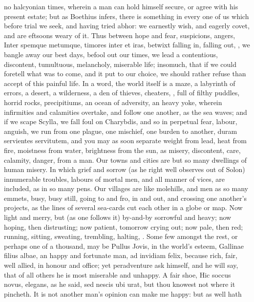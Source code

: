 {{no halcyonian times, wherein a man can hold himself secure, or agree
with his present estate; but as Boethius infers, there is
something in every one of us which before trial we seek, and having
tried abhor:  we earnestly wish, and eagerly covet, and are
eftsoons weary of it. Thus between hope and fear, suspicions, angers,
Inter spemque metumque, timores inter et iras, betwixt falling
in, falling out, \etc{}, we bangle away our best days, befool out our
times, we lead a contentious, discontent, tumultuous, melancholy,
miserable life; insomuch, that if we could foretell what was to come,
and it put to our choice, we should rather refuse than accept of this
painful life. In a word, the world itself is a maze, a labyrinth of
errors, a desert, a wilderness, a den of thieves, cheaters, \etc{}, full
of filthy puddles, horrid rocks, precipitiums, an ocean of adversity,
an heavy yoke, wherein infirmities and calamities overtake, and follow
one another, as the sea waves; and if we scape Scylla, we fall foul on
Charybdis, and so in perpetual fear, labour, anguish, we run from one
plague, one mischief, one burden to another, duram servientes
servitutem, and you may as soon separate weight from lead, heat from
fire, moistness from water, brightness from the sun, as misery,
discontent, care, calamity, danger, from a man. Our towns and cities
are but so many dwellings of human misery. In which grief and sorrow
(as he right well observes out of Solon) innumerable troubles,
labours of mortal men, and all manner of vices, are included, as in so
many pens. Our villages are like molehills, and men as so many emmets,
busy, busy still, going to and fro, in and out, and crossing one
another's projects, as the lines of several sea-cards cut each other in
a globe or map. Now light and merry, but (as one follows it)
by-and-by sorrowful and heavy; now hoping, then distrusting; now
patient, tomorrow crying out; now pale, then red; running, sitting,
sweating, trembling, halting, \etc{}. Some few amongst the rest, or perhaps
one of a thousand, may be Pullus Jovis, in the world's esteem, Gallinae
filius albae, an happy and fortunate man, ad invidiam felix, because
rich, fair, well allied, in honour and office; yet peradventure ask
himself, and he will say, that of all others he is most miserable
and unhappy. A fair shoe, Hic soccus novus, elegans, as he said,
sed nescis ubi urat, but thou knowest not where it pincheth. It is not
another man's opinion can make me happy: but as \Seneca well hath
}}
